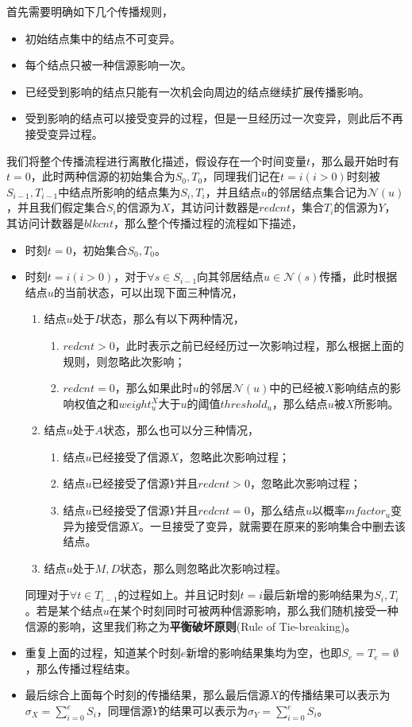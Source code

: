 首先需要明确如下几个传播规则，
\begin{itemize}
\label{list:rules-for-xtran}
\item 初始结点集中的结点不可变异。
\item 每个结点只被一种信源影响一次。
\item 已经受到影响的结点只能有一次机会向周边的结点继续扩展传播影响。
\item 受到影响的结点可以接受变异的过程，但是一旦经历过一次变异，则此后不再接受变异过程。
\end{itemize}


我们将整个传播流程进行离散化描述，假设存在一个时间变量$t$，那么最开始时有$t=0$，此时两种信源的初始集合为$S_{0}, T_{0}$，同理我们记在$t=i(i>0)$时刻被$S_{i-1}, T_{i-1}$中结点所影响的结点集为$S_{i}, T_{i}$，并且结点$u$的邻居结点集合记为$\mathcal{N}(u)$，并且我们假定集合$S_{i}$的信源为$X$，其访问计数器是$redcnt$，集合$T_{i}$的信源为$Y$，其访问计数器是$blkcnt$，那么整个传播过程的流程如下描述，
\begin{itemize}
\item 时刻$t=0$，初始集合$S_{0}, T_{0}$。
\item 时刻$t=i(i>0)$，对于$\forall s \in S_{i-1}$向其邻居结点$u \in \mathcal{N}(s)$传播，此时根据结点$u$的当前状态，可以出现下面三种情况，
	\begin{enumerate}
	\item 结点$u$处于$I$状态，那么有以下两种情况，
		\begin{enumerate}
		\item $redcnt>0$，此时表示之前已经经历过一次影响过程，那么根据上面的规则，则忽略此次影响；
		\item $redcnt=0$，那么如果此时$u$的邻居$\mathcal{N}(u)$中的已经被$X$影响结点的影响权值之和$weight_{u}^{X}$大于$u$的阈值$threshold_{u}$，那么结点$u$被$X$所影响。
		\end{enumerate}
	\item 结点$u$处于$A$状态，那么也可以分三种情况，
		\begin{enumerate}
		\item 结点$u$已经接受了信源$X$，忽略此次影响过程；
		\item 结点$u$已经接受了信源$Y$并且$redcnt>0$，忽略此次影响过程；
		\item 结点$u$已经接受了信源$Y$并且$redcnt=0$，那么结点$u$以概率$mfactor_{u}$变异为接受信源$X$。一旦接受了变异，就需要在原来的影响集合中删去该结点。
		\end{enumerate}
	\item 结点$u$处于$M,D$状态，那么则忽略此次影响过程。
	\end{enumerate}
	同理对于$\forall t \in T_{i-1}$的过程如上。并且记时刻$t=i$最后新增的影响结果为$S_{i}, T_{i}$。若是某个结点$u$在某个时刻同时可被两种信源影响，那么我们随机接受一种信源的影响，这里我们称之为\textbf{平衡破坏原则}(Rule of Tie-breaking)。
\item 重复上面的过程，知道某个时刻$e$新增的影响结果集均为空，也即$S_{e}=T_{e}=\emptyset$，那么传播过程结束。
\item 最后综合上面每个时刻的传播结果，那么最后信源$X$的传播结果可以表示为$\sigma_{X}=\sum_{i=0}^{e}S_{i}$，同理信源$Y$的结果可以表示为$\sigma_{Y}=\sum_{i=0}^{e}S_{i}$。
\end{itemize}

